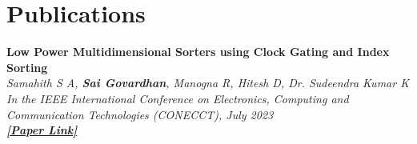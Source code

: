 \section{\sc Publications}

{\bf{Low Power Multidimensional Sorters using Clock Gating and Index Sorting}} \\
\textit{Samahith S A, {\bf{Sai Govardhan}}, Manogna R, Hitesh D, Dr. Sudeendra Kumar K \\
  In the IEEE International Conference on Electronics, Computing and Communication Technologies (CONECCT), July 2023 \\
  {\bf \href{https://ieeexplore.ieee.org/document/10234758}{[Paper Link]}}}

\endinput
